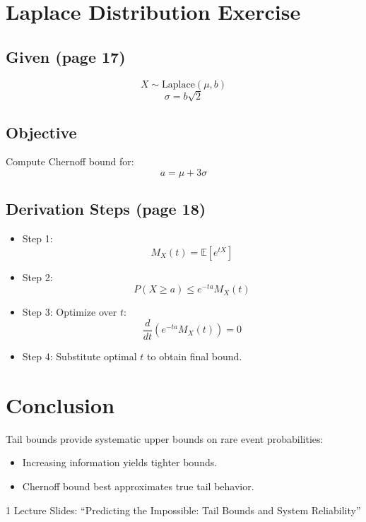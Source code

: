 \documentclass[12pt]{article}
\begin{document}
\section*{Laplace Distribution Exercise}

\subsection*{Given (page 17)}
\[
X \sim \text{Laplace}(\mu, b)
\]
\[
\sigma = b\sqrt{2}
\]

\subsection*{Objective}
Compute Chernoff bound for:
\[
a = \mu + 3\sigma
\]

\subsection*{Derivation Steps (page 18)}

\begin{itemize}
    \item Step 1:
    \[
    M_X(t) = \mathbb{E}[e^{tX}]
    \]
    \item Step 2:
    \[
    P(X \ge a) \le e^{-ta} M_X(t)
    \]
    \item Step 3:
    Optimize over $t$:
    \[
    \frac{d}{dt} \left(e^{-ta} M_X(t)\right) = 0
    \]
    \item Step 4:
    Substitute optimal $t$ to obtain final bound.
\end{itemize}

\section*{Conclusion}
Tail bounds provide systematic upper bounds on rare event probabilities:
\begin{itemize}
    \item Increasing information yields tighter bounds.
    \item Chernoff bound best approximates true tail behavior.
\end{itemize}


\begin{thebibliography}{1}
 Lecture Slides: ``Predicting the Impossible: Tail Bounds and System Reliability'' \cite{turn0file0}
\end{thebibliography}
\end{document}
